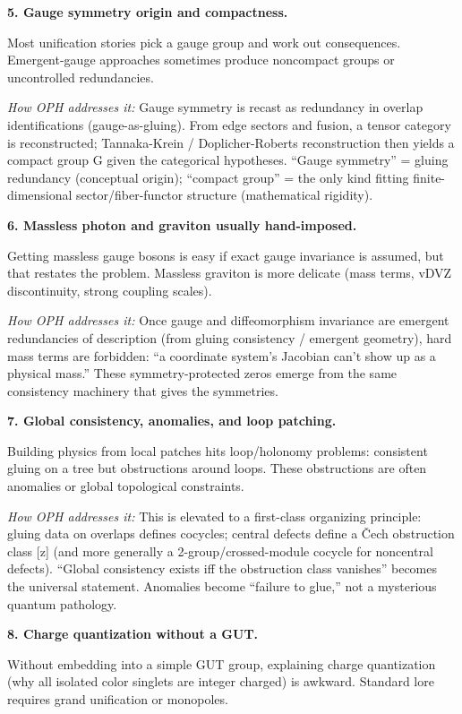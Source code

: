 \documentclass[11pt,a4paper]{article}
\theoremstyle{remark}
\begin{document}
\textbf{5. Gauge symmetry origin and compactness.}

Most unification stories pick a gauge group and work out consequences. Emergent-gauge approaches sometimes produce noncompact groups or uncontrolled redundancies.

\emph{How OPH addresses it:} Gauge symmetry is recast as redundancy in overlap identifications (gauge-as-gluing). From edge sectors and fusion, a tensor category is reconstructed; Tannaka-Krein / Doplicher-Roberts reconstruction then yields a compact group G given the categorical hypotheses. ``Gauge symmetry'' = gluing redundancy (conceptual origin); ``compact group'' = the only kind fitting finite-dimensional sector/fiber-functor structure (mathematical rigidity).

\textbf{6. Massless photon and graviton usually hand-imposed.}

Getting massless gauge bosons is easy if exact gauge invariance is assumed, but that restates the problem. Massless graviton is more delicate (mass terms, vDVZ discontinuity, strong coupling scales).

\emph{How OPH addresses it:} Once gauge and diffeomorphism invariance are emergent redundancies of description (from gluing consistency / emergent geometry), hard mass terms are forbidden: ``a coordinate system's Jacobian can't show up as a physical mass.'' These symmetry-protected zeros emerge from the same consistency machinery that gives the symmetries.

\textbf{7. Global consistency, anomalies, and loop patching.}

Building physics from local patches hits loop/holonomy problems: consistent gluing on a tree but obstructions around loops. These obstructions are often anomalies or global topological constraints.

\emph{How OPH addresses it:} This is elevated to a first-class organizing principle: gluing data on overlaps defines cocycles; central defects define a Čech obstruction class {[}z{]} (and more generally a 2-group/crossed-module cocycle for noncentral defects). ``Global consistency exists iff the obstruction class vanishes'' becomes the universal statement. Anomalies become ``failure to glue,'' not a mysterious quantum pathology.

\textbf{8. Charge quantization without a GUT.}

Without embedding into a simple GUT group, explaining charge quantization (why all isolated color singlets are integer charged) is awkward. Standard lore requires grand unification or monopoles.
\end{document}
